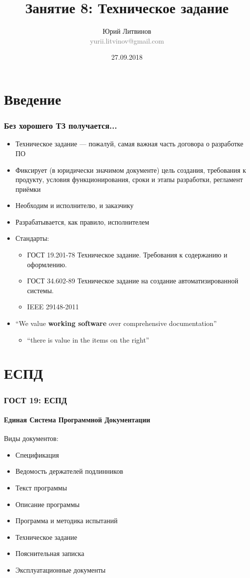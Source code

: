 \documentclass[xetex,mathserif,serif]{beamer}
\title{Занятие 8: Техническое задание}
\author[Юрий Литвинов]{Юрий Литвинов\\\small{\textcolor{gray}{yurii.litvinov@gmail.com}}}
\date{27.09.2018}
\begin{document}
	\frame{\titlepage}

	\section{Введение}

	\begin{frame}
		\frametitle{Без хорошего ТЗ получается...}
		\begin{itemize}
			\item Техническое задание --- пожалуй, самая важная часть договора о разработке ПО
			\item Фиксирует (в юридически значимом документе) цель создания, требования к продукту, условия функционирования, сроки и этапы разработки, регламент приёмки
			\item Необходим и исполнителю, и заказчику
			\item Разрабатывается, как правило, исполнителем
			\item Стандарты:
			\begin{itemize}
				\item ГОСТ 19.201-78 Техническое задание. Требования к содержанию и оформлению.
				\item ГОСТ 34.602-89 Техническое задание на создание автоматизированной системы.
				\item IEEE 29148-2011
			\end{itemize}
			\item ``We value \textbf{working software} over comprehensive documentation''
			\begin{itemize}
				\item ``there is value in the items on the right''
			\end{itemize}
		\end{itemize}
	\end{frame}

	\section{ЕСПД}

	\begin{frame}
		\frametitle{ГОСТ 19: ЕСПД}
		\framesubtitle{Единая Система Программной Документации}
		Виды документов:
		\begin{itemize}
			\item Спецификация
			\item Ведомость держателей подлинников
			\item Текст программы
			\item Описание программы
			\item Программа и методика испытаний
			\item Техническое задание
			\item Пояснительная записка
			\item Эксплуатационные документы
		\end{itemize}
	\end{frame}
\end{document}
